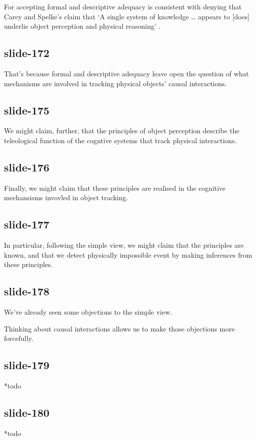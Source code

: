 \documentclass[12pt,\papersize]{extarticle}
\begin{document}
For accepting formal and descriptive adequacy is consistent with denying that Carey and Spelke's claim that ‘A single system of knowledge … appears to [does] underlie object perception and physical reasoning’ \citep[p.\ 175]{Carey:1994bh}.
 
\subsection{slide-172}
That's because formal and descriptive adequacy leave open the question of what mechanisms are involved in tracking physical objects' causal interactions.
 
\subsection{slide-175}
We might claim, further, that the principles of object perception describe the teleological function of the cogntive systems that track physical interactions.
 
\subsection{slide-176}
Finally, we might claim that these principles are realised in the cognitive mechansisms invovled in object tracking.
 
\subsection{slide-177}
In particular, following the simple view, we might claim that the principles are known, and that we detect physically impossible event by making inferences from these principles.
 
\subsection{slide-178}
We've already seen some objections to the simple view.
 
Thinking about causal interactions allows us to make those objections more forcefully.
 
\subsection{slide-179}
*todo
 
\subsection{slide-180}
*todo
 
\end{document}
